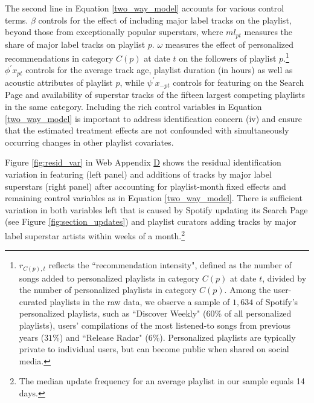 The second line in Equation \ref{two_way_model} accounts for various control terms. $\beta$ controls for the effect of including major label tracks on the playlist, beyond those from exceptionally popular superstars, where $ml_{pt}$ measures the share of major label tracks on playlist $p$. $\omega$ measures the effect of personalized recommendations in category $C(p)$ at date $t$ on the followers of playlist $p$.\footnote{$r_{C(p),t}$ reflects the ``recommendation intensity", defined as the number of songs added to personalized playlists in category $C(p)$ at date $t$, divided by the number of personalized playlists in category $C(p)$.
Among the user-curated playlists in the raw data, we observe a sample of $1,634$ of Spotify's personalized playlists, such as ``Discover Weekly" (60\% of all personalized playlists), users' compilations of the most listened-to songs from previous years ($31\%$) and ``Release Radar" ($6\%$). Personalized playlists are typically private to individual users, but can become public when shared on social media.}
$\phi^{\prime} x_{pt}$ controls for the average track age, playlist duration (in hours) as well as acoustic
attributes of playlist $p$, while $\psi^{\prime} x_{-pt}$ controls for featuring on the Search Page and availability of superstar tracks of the fifteen largest competing playlists in the same category. %
Including the rich control variables in Equation \ref{two_way_model} is important to address identification concern (iv) and ensure that the estimated treatment effects are not confounded with simultaneously occurring changes in other playlist covariates.

Figure \ref{fig:resid_var} in Web Appendix \hyperref[appendix:appendix_model]{D} shows the residual identification variation in featuring (left panel) and additions of tracks by major label superstars (right panel) after accounting for playlist-month fixed effects and remaining control variables as in Equation \ref{two_way_model}. There is sufficient variation in both variables left that is caused by Spotify updating its Search Page (see Figure \ref{fig:section_updates}) and playlist curators adding tracks by major label superstar artists within weeks of a month.\footnote{The median update frequency for an average playlist in our sample equals 14 days.}

